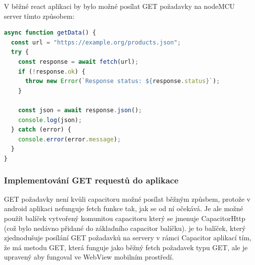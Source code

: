 V běžné react aplikaci by bylo možné posílat GET požadavky na nodeMCU server tímto způsobem:

\begin{lstlisting}[language=JavaScript, caption={Základní způsob posílání GET požadavků v JavaScriptu}, label={lst:JavaScriptFetchFunkce}]
async function getData() {
  const url = "https://example.org/products.json";
  try {
    const response = await fetch(url);
    if (!response.ok) {
      throw new Error(`Response status: ${response.status}`);
    }

    const json = await response.json();
    console.log(json);
  } catch (error) {
    console.error(error.message);
  }
}
\end{lstlisting}


\subsubsection{Implementování GET requestů do aplikace}

GET požadavky není kvůli capacitoru možné posílat běžným způsbem, protože v android aplikaci nefunguje fetch funkce tak, jak se od ní očekává. Je ale možné použít balíček vytvořený komunitou capacitoru který se jmenuje CapacitorHttp (což bylo nedávno přidané do základního capacitor balíčku). je to balíček, který zjednodušuje posílání GET požadavků na servery v rámci Capacitor aplikací tím, že má metodu GET, která funguje jako běžný fetch požadavek typu GET, ale je upravený aby fungoval ve WebView mobilním prostředí.

